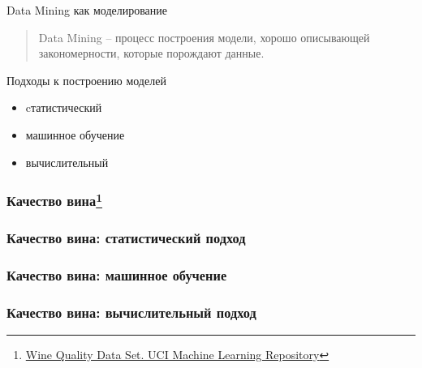 \documentclass[aspectratio=169]{beamer}
\begin{document}
\begin{frame}{Data Mining как моделирование}

\begin{quote}{Data Mining}
-- процесс построения модели, хорошо описывающей закономерности, которые порождают данные.
\end{quote}

Подходы к построению моделей
\begin{itemize}
\item cтатистический
\item машинное обучение
\item вычислительный
\end{itemize}

\end{frame}

\begin{frame}
\frametitle<1>{Качество вина\footnote{\href{https://archive.ics.uci.edu/ml/datasets/Wine+Quality}{Wine Quality Data Set. UCI Machine Learning Repository}}}
\frametitle<2>{Качество вина: статистический подход}
\frametitle<3>{Качество вина: машинное обучение}
\frametitle<4>{Качество вина: вычислительный подход}


\end{frame}
\end{document}
